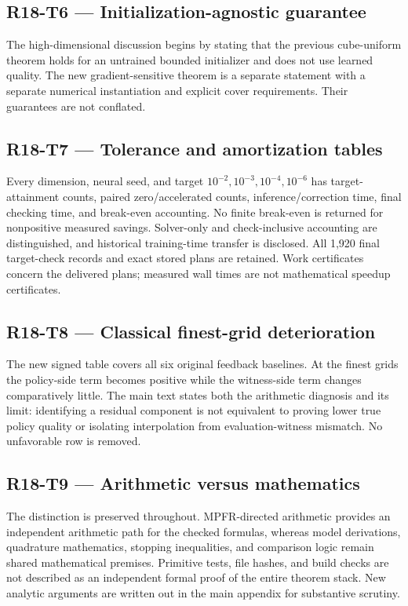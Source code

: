 \subsection{R18-T6 --- Initialization-agnostic guarantee}
The high-dimensional discussion begins by stating that the previous cube-uniform theorem holds for an untrained bounded initializer and does not use learned quality. The new gradient-sensitive theorem is a separate statement with a separate numerical instantiation and explicit cover requirements. Their guarantees are not conflated.

\subsection{R18-T7 --- Tolerance and amortization tables}
Every dimension, neural seed, and target $10^{-2},10^{-3},10^{-4},10^{-6}$ has target-attainment counts, paired zero/accelerated counts, inference/correction time, final checking time, and break-even accounting. No finite break-even is returned for nonpositive measured savings. Solver-only and check-inclusive accounting are distinguished, and historical training-time transfer is disclosed. All 1,920 final target-check records and exact stored plans are retained. Work certificates concern the delivered plans; measured wall times are not mathematical speedup certificates.

\subsection{R18-T8 --- Classical finest-grid deterioration}
The new signed table covers all six original feedback baselines. At the finest grids the policy-side term becomes positive while the witness-side term changes comparatively little. The main text states both the arithmetic diagnosis and its limit: identifying a residual component is not equivalent to proving lower true policy quality or isolating interpolation from evaluation-witness mismatch. No unfavorable row is removed.

\subsection{R18-T9 --- Arithmetic versus mathematics}
The distinction is preserved throughout. MPFR-directed arithmetic provides an independent arithmetic path for the checked formulas, whereas model derivations, quadrature mathematics, stopping inequalities, and comparison logic remain shared mathematical premises. Primitive tests, file hashes, and build checks are not described as an independent formal proof of the entire theorem stack. New analytic arguments are written out in the main appendix for substantive scrutiny.

